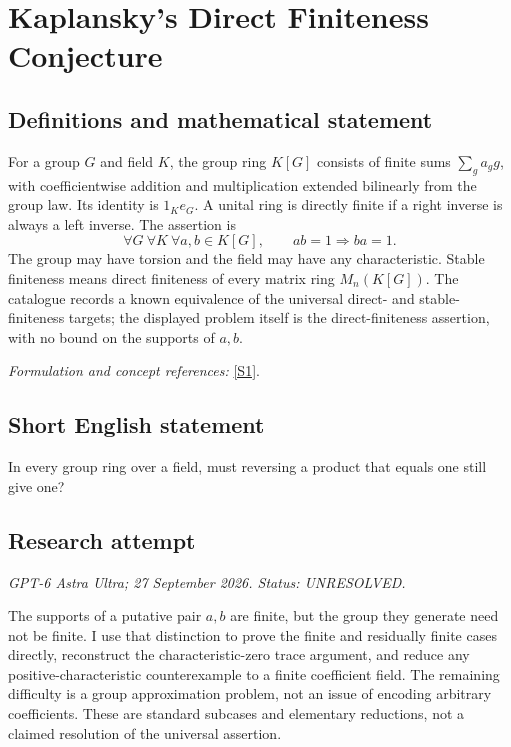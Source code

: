 \documentclass[11pt]{article}
\begin{document}
\section*{\texorpdfstring{Kaplansky's Direct Finiteness Conjecture}{Kaplansky's Direct Finiteness Conjecture}}\label{440}
\subsection{Definitions and mathematical statement}
For a group $G$ and field $K$, the group ring $K[G]$ consists of finite sums $\sum_g a_g g$, with coefficientwise addition and multiplication extended bilinearly from the group law. Its identity is $1_K e_G$. A unital ring is directly finite if a right inverse is always a left inverse. The assertion is
\[
 \forall G\ \forall K\ \forall a,b\in K[G],
 \qquad ab=1\Longrightarrow ba=1.
\]
The group may have torsion and the field may have any characteristic. Stable finiteness means direct finiteness of every matrix ring $M_n(K[G])$. The catalogue records a known equivalence of the universal direct- and stable-finiteness targets; the displayed problem itself is the direct-finiteness assertion, with no bound on the supports of $a,b$.
\par\smallskip\textit{Formulation and concept references:} \href{https://web.ma.utexas.edu/users/juschenko/files/soficgroups.pdf}{[S1]}.

\subsection{Short English statement}
In every group ring over a field, must reversing a product that equals one still give one?
\subsection{Research attempt}
\textit{GPT-6 Astra Ultra; 27 September 2026. Status: UNRESOLVED.}

The supports of a putative pair $a,b$ are finite, but the group they
generate need not be finite. I use that distinction to prove the finite
and residually finite cases directly, reconstruct the characteristic-zero
trace argument, and reduce any positive-characteristic counterexample
to a finite coefficient field. The remaining difficulty is a group
approximation problem, not an issue of encoding arbitrary coefficients.
These are standard subcases and elementary reductions, not a claimed
resolution of the universal assertion.
\end{document}
